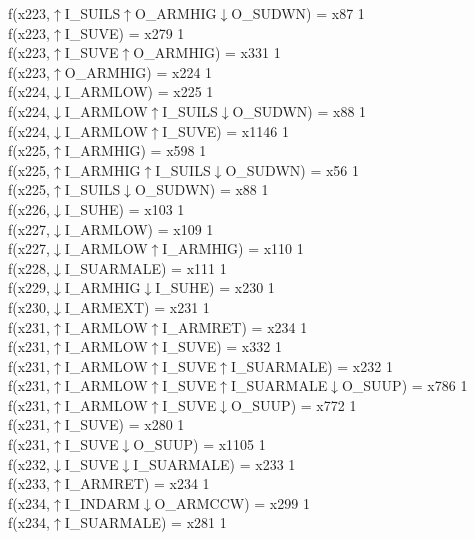 f(x223,$\uparrow$I\_SUILS$\uparrow$O\_ARMHIG$\downarrow$O\_SUDWN) = x87 {1} \\
f(x223,$\uparrow$I\_SUVE) = x279 {1} \\
f(x223,$\uparrow$I\_SUVE$\uparrow$O\_ARMHIG) = x331 {1} \\
f(x223,$\uparrow$O\_ARMHIG) = x224 {1} \\
f(x224,$\downarrow$I\_ARMLOW) = x225 {1} \\
f(x224,$\downarrow$I\_ARMLOW$\uparrow$I\_SUILS$\downarrow$O\_SUDWN) = x88 {1} \\
f(x224,$\downarrow$I\_ARMLOW$\uparrow$I\_SUVE) = x1146 {1} \\
f(x225,$\uparrow$I\_ARMHIG) = x598 {1} \\
f(x225,$\uparrow$I\_ARMHIG$\uparrow$I\_SUILS$\downarrow$O\_SUDWN) = x56 {1} \\
f(x225,$\uparrow$I\_SUILS$\downarrow$O\_SUDWN) = x88 {1} \\
f(x226,$\downarrow$I\_SUHE) = x103 {1} \\
f(x227,$\downarrow$I\_ARMLOW) = x109 {1} \\
f(x227,$\downarrow$I\_ARMLOW$\uparrow$I\_ARMHIG) = x110 {1} \\
f(x228,$\downarrow$I\_SUARMALE) = x111 {1} \\
f(x229,$\downarrow$I\_ARMHIG$\downarrow$I\_SUHE) = x230 {1} \\
f(x230,$\downarrow$I\_ARMEXT) = x231 {1} \\
f(x231,$\uparrow$I\_ARMLOW$\uparrow$I\_ARMRET) = x234 {1} \\
f(x231,$\uparrow$I\_ARMLOW$\uparrow$I\_SUVE) = x332 {1} \\
f(x231,$\uparrow$I\_ARMLOW$\uparrow$I\_SUVE$\uparrow$I\_SUARMALE) = x232 {1} \\
f(x231,$\uparrow$I\_ARMLOW$\uparrow$I\_SUVE$\uparrow$I\_SUARMALE$\downarrow$O\_SUUP) = x786 {1} \\
f(x231,$\uparrow$I\_ARMLOW$\uparrow$I\_SUVE$\downarrow$O\_SUUP) = x772 {1} \\
f(x231,$\uparrow$I\_SUVE) = x280 {1} \\
f(x231,$\uparrow$I\_SUVE$\downarrow$O\_SUUP) = x1105 {1} \\
f(x232,$\downarrow$I\_SUVE$\downarrow$I\_SUARMALE) = x233 {1} \\
f(x233,$\uparrow$I\_ARMRET) = x234 {1} \\
f(x234,$\uparrow$I\_INDARM$\downarrow$O\_ARMCCW) = x299 {1} \\
f(x234,$\uparrow$I\_SUARMALE) = x281 {1} \\
